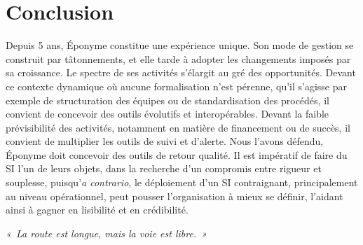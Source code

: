 \section*{Conclusion}

Depuis 5 ans, Éponyme constitue une expérience unique.
Son mode de gestion se construit par tâtonnements, et elle
tarde à adopter les changements imposés par sa croissance.
Le spectre de ses activités s'élargit au gré des opportunités.
Devant ce contexte dynamique où aucune formalisation n'est pérenne,
qu'il s'agisse par exemple de structuration des équipes ou de standardisation des procédés,
il convient de concevoir des outils évolutifs et interopérables.
Devant la faible prévisibilité des activités,
notamment en matière de financement ou de succès,
il convient de multiplier les outils de suivi et d'alerte.
Nous l'avons défendu, Éponyme doit concevoir des outils de retour qualité.
Il est impératif de faire du SI l'un de leurs objets, dans la recherche
d'un compromis entre rigueur et souplesse, puisqu'\textit{a contrario},
le déploiement d'un SI contraignant, principalement au niveau opérationnel,
peut pousser l'organisation à mieux se définir,
l'aidant ainsi à gagner en lisibilité et en crédibilité.

\textit{«~La route est longue, mais la voie est libre.~»}